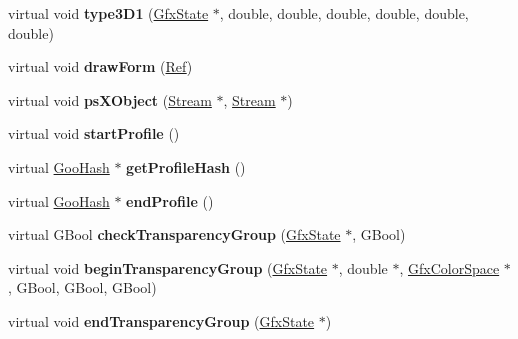 \begin{DoxyCompactItemize}
\item 
\mbox{\label{class_output_dev_aaadf8faecf05a1719baf96219fcd13f4}} 
virtual void {\bfseries type3\+D1} (\hyperlink{class_gfx_state}{Gfx\+State} $\ast$, double, double, double, double, double, double)
\item 
\mbox{\label{class_output_dev_a8347dc89808e1ab4b69f8309ad0edc9e}} 
virtual void {\bfseries draw\+Form} (\hyperlink{struct_ref}{Ref})
\item 
\mbox{\label{class_output_dev_a330bd1fb84b3c5bcbb6db2579ec86060}} 
virtual void {\bfseries ps\+X\+Object} (\hyperlink{class_stream}{Stream} $\ast$, \hyperlink{class_stream}{Stream} $\ast$)
\item 
\mbox{\label{class_output_dev_a087c3f2802f97d852c323a003086fbb8}} 
virtual void {\bfseries start\+Profile} ()
\item 
\mbox{\label{class_output_dev_ad1bc9865d811a68c0bdcf2a73bcf004b}} 
virtual \hyperlink{class_goo_hash}{Goo\+Hash} $\ast$ {\bfseries get\+Profile\+Hash} ()
\item 
\mbox{\label{class_output_dev_a465aec15453cbdf837b0d5fb117aee46}} 
virtual \hyperlink{class_goo_hash}{Goo\+Hash} $\ast$ {\bfseries end\+Profile} ()
\item 
\mbox{\label{class_output_dev_a7c277c07f07e0c4c70d048b57aa0b3c7}} 
virtual G\+Bool {\bfseries check\+Transparency\+Group} (\hyperlink{class_gfx_state}{Gfx\+State} $\ast$, G\+Bool)
\item 
\mbox{\label{class_output_dev_adf5dc30b2401ef362ff5c24f167169a3}} 
virtual void {\bfseries begin\+Transparency\+Group} (\hyperlink{class_gfx_state}{Gfx\+State} $\ast$, double $\ast$, \hyperlink{class_gfx_color_space}{Gfx\+Color\+Space} $\ast$, G\+Bool, G\+Bool, G\+Bool)
\item 
\mbox{\label{class_output_dev_ab40b03e24dab2d6cd11de6a3551d2593}} 
virtual void {\bfseries end\+Transparency\+Group} (\hyperlink{class_gfx_state}{Gfx\+State} $\ast$)
\item 
\mbox{\label{class_output_dev_ada3eb127f26195713c2609a6eea6990c}} 

\end{DoxyCompactItemize}
